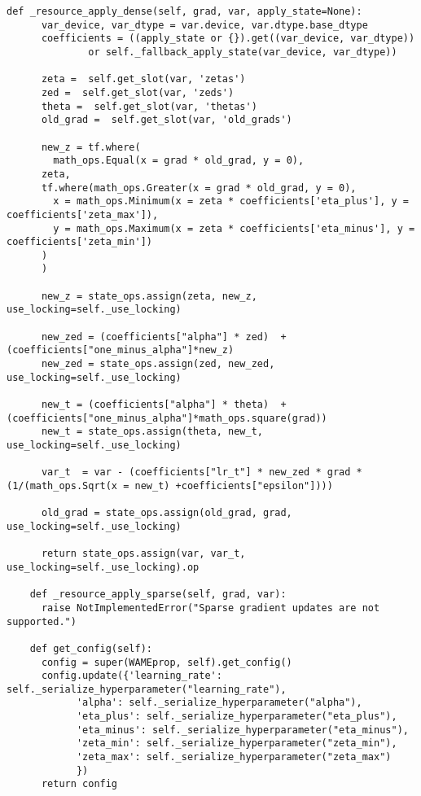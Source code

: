 \documentclass[12pt]{article}
\numberwithin{equation}{section}
\numberwithin{figure}{section}
\numberwithin{table}{section}
\begin{document}
\begin{lstlisting}[caption = {WAME class implementation}, label ={code:wameclass}]
    def _resource_apply_dense(self, grad, var, apply_state=None):
      var_device, var_dtype = var.device, var.dtype.base_dtype
      coefficients = ((apply_state or {}).get((var_device, var_dtype))
              or self._fallback_apply_state(var_device, var_dtype))
  
      zeta =  self.get_slot(var, 'zetas')
      zed =  self.get_slot(var, 'zeds')
      theta =  self.get_slot(var, 'thetas')
      old_grad =  self.get_slot(var, 'old_grads')
  
      new_z = tf.where(
        math_ops.Equal(x = grad * old_grad, y = 0),
      zeta,
      tf.where(math_ops.Greater(x = grad * old_grad, y = 0),
        x = math_ops.Minimum(x = zeta * coefficients['eta_plus'], y = coefficients['zeta_max']),
        y = math_ops.Maximum(x = zeta * coefficients['eta_minus'], y = coefficients['zeta_min'])
      )
      )
        
      new_z = state_ops.assign(zeta, new_z, use_locking=self._use_locking)
  
      new_zed = (coefficients["alpha"] * zed)  + (coefficients["one_minus_alpha"]*new_z)
      new_zed = state_ops.assign(zed, new_zed, use_locking=self._use_locking)
  
      new_t = (coefficients["alpha"] * theta)  + (coefficients["one_minus_alpha"]*math_ops.square(grad))
      new_t = state_ops.assign(theta, new_t, use_locking=self._use_locking)
  
      var_t  = var - (coefficients["lr_t"] * new_zed * grad * (1/(math_ops.Sqrt(x = new_t) +coefficients["epsilon"])))
  
      old_grad = state_ops.assign(old_grad, grad, use_locking=self._use_locking)
  
      return state_ops.assign(var, var_t, use_locking=self._use_locking).op
  
    def _resource_apply_sparse(self, grad, var):
      raise NotImplementedError("Sparse gradient updates are not supported.")
    
    def get_config(self):
      config = super(WAMEprop, self).get_config()
      config.update({'learning_rate': self._serialize_hyperparameter("learning_rate"),
            'alpha': self._serialize_hyperparameter("alpha"),
            'eta_plus': self._serialize_hyperparameter("eta_plus"),
            'eta_minus': self._serialize_hyperparameter("eta_minus"),
            'zeta_min': self._serialize_hyperparameter("zeta_min"),
            'zeta_max': self._serialize_hyperparameter("zeta_max") 
            })
      return config
  
\end{lstlisting}
\end{document}
